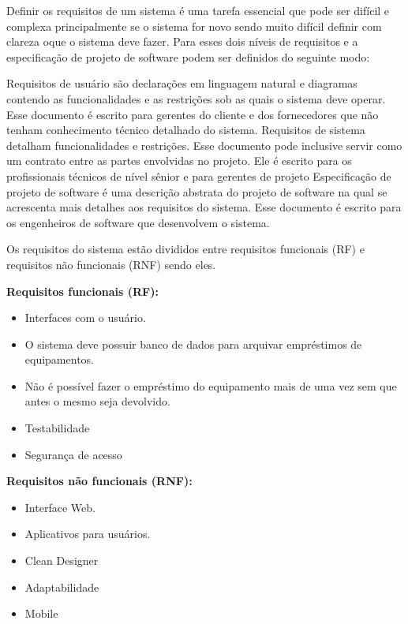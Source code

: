\documentclass[
12pt,				%
oneside,			%
a4paper,			%
section=TITLE,
brazil,				%
]{abntex2}
\begin{document}
  Definir os requisitos de um sistema é uma tarefa essencial que pode ser difícil
  e complexa principalmente se o sistema for novo sendo muito difícil definir com
  clareza oque o sistema deve fazer.  Para\cite{sommerville2008engenharia} esses dois níveis
  de requisitos e a especificação de projeto de software podem ser definidos do
  seguinte modo:

  \begin{citacao}
    Requisitos de usuário são declarações em linguagem natural e diagramas
    contendo as funcionalidades e as restrições sob as quais o sistema deve
    operar.
    Esse documento é escrito para gerentes do cliente e dos fornecedores
    que não tenham conhecimento técnico detalhado do sistema.  Requisitos de
    sistema detalham funcionalidades e restrições. Esse documento pode inclusive
    servir como um contrato entre as partes envolvidas no projeto.
    Ele é escrito para os profissionais técnicos de nível sênior e para gerentes
    de projeto Especificação de projeto de software é uma descrição abstrata do
    projeto de software na qual se acrescenta mais detalhes aos requisitos do
    sistema. Esse documento é escrito para os engenheiros de software que
    desenvolvem o sistema.\cite[p.78]{sommerville2008engenharia}
  \end{citacao}

  Os requisitos do sistema estão divididos entre requisitos funcionais (RF) e
  requisitos não funcionais (RNF) sendo eles.

  \textbf{Requisitos funcionais (RF):}

  \begin{itemize}
    \item Interfaces com o usuário.
    \item O sistema deve possuir banco de dados para arquivar empréstimos de equipamentos.
    \item Não é possível fazer o empréstimo do equipamento mais de uma vez sem
      que antes o mesmo seja devolvido.
    \item Testabilidade
    \item Segurança de acesso
  \end{itemize}


  \textbf{Requisitos não funcionais (RNF):}

  \begin{itemize}
    \item Interface Web.
    \item Aplicativos para usuários.
    \item Clean Designer
    \item Adaptabilidade
    \item Mobile
  \end{itemize}
\end{document}
